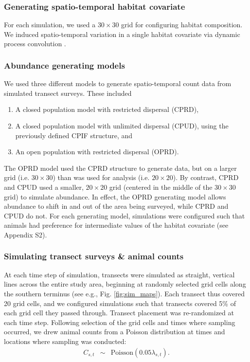 \documentclass[12pt,english]{article}
\begin{document}
\begin{spacing}{1.9}
\subsubsection{Generating spatio-temporal habitat covariate}

For each simulation, we used a $30 \times 30$ grid for configuring habitat composition.  We induced spatio-temporal variation in a single habitat covariate via dynamic process convolution \citep[][e.g., Fig. \ref{fig:sim_maps}]{CalderEtAl2002}.

\subsubsection{Abundance generating models}

We used three different models to generate spatio-temporal count data from simulated transect surveys.  These included
\begin{enumerate}
   \item  A closed population model with restricted dispersal (CPRD),
   \item A closed population model with unlimited dispersal (CPUD), using the previously defined CPIF structure, and
   \item An open population with restricted dispersal (OPRD).
\end{enumerate}
The OPRD model used the CPRD structure to generate data, but on a larger grid (i.e. $30 \times 30$) than was used for analysis (i.e. $20 \times 20$).  By contrast, CPRD and CPUD used a smaller, $20 \times 20$ grid (centered in the middle of the $30 \times 30$ grid) to simulate abundance.  In effect, the OPRD generating model allows abundance to shift in and out of the area being surveyed, while CPRD and CPUD do not.  For each generating model, simulations were configured such that animals had preference for intermediate values of the habitat covariate (see Appendix S2).

\subsubsection{Simulating transect surveys \& animal counts}

At each time step of simulation, transects were simulated as straight, vertical lines across the entire study area, beginning at randomly selected grid cells along the southern terminus (see e.g., Fig. \ref{fig:sim_maps}).  Each transect thus covered 20 grid cells, and we configured simulations such that transects covered 5\% of each grid cell they passed through.  Transect placement was re-randomized at each time step.  Following selection of the grid cells and times where sampling occurred, we drew animal counts from a Poisson distribution at times and locations where sampling was conducted:
\begin{eqnarray*}
  C_{s,t} & \sim & \text{Poisson}(0.05 \lambda_{s,t}).
\end{eqnarray*}


\end{spacing}
\end{document}
